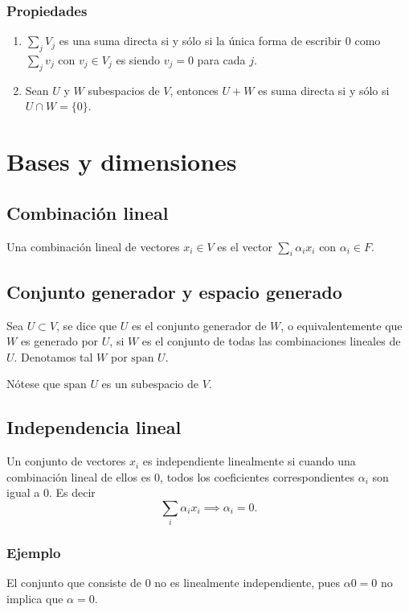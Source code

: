 \documentclass{article}
\begin{document}
\subsubsection*{Propiedades}
\begin{enumerate}
    \item $\sum_j V_j$ es una suma directa si y sólo si
    la única forma de escribir $0$ como $\sum_j v_j$
    con $v_j\in V_j$ es siendo $v_j=0$ para cada $j$.
    \item Sean $U$ y $W$ subespacios de $V$, entonces
    $U+W$ es suma directa si y sólo si $U\cap W = \{0\}$.
\end{enumerate}

\newpage

\section{Bases y dimensiones}
\subsection{Combinación lineal}
Una combinación lineal de vectores $x_i \in V$ es el vector $\sum_i \alpha_i x_i$ con $\alpha_i\in F$.

\newcommand{\spn}{\text{span }}
\subsection{Conjunto generador y espacio generado}
Sea $U\subset V$, se dice que $U$ es el conjunto generador de $W$,
o equivalentemente que $W$ es generado por $U$, si 
$W$ es el conjunto de todas las combinaciones lineales de $U$.
Denotamos tal $W$ por $\spn U$.

Nótese que $\spn U$ es un subespacio de $V$.

\subsection{Independencia lineal}
Un conjunto de vectores $x_i$ es independiente linealmente si
cuando una combinación lineal de ellos es $0$, todos los coeficientes
correspondientes $\alpha_i$ son igual a $0$. Es decir
$$\sum_i \alpha_i x_i \implies \alpha_i = 0.$$

\subsubsection*{Ejemplo}
El conjunto que consiste de $0$ no es linealmente independiente, pues
$\alpha 0 = 0$ no implica que $\alpha = 0$.
\end{document}
